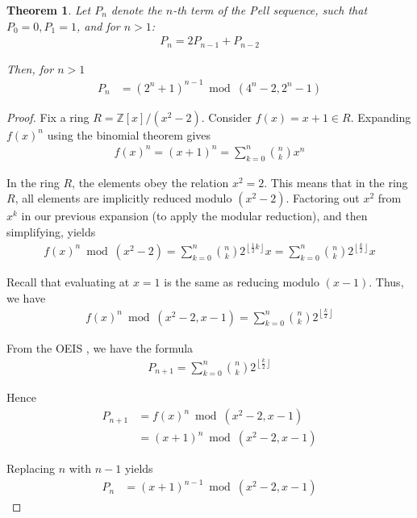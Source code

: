 \documentclass[12pt,reqno]{article}
\theoremstyle{plain}
\newtheorem{theorem}{Theorem}
\theoremstyle{definition}
\newcommand{\floor}[1]{\left\lfloor #1 \right\rfloor}
\begin{document}
\begin{theorem} \label{theorem:pell}
Let $P_n$ denote the $n$-th term of the Pell sequence, such that $P_0 = 0, P_1 = 1$, and for $n > 1$:
\begin{align*}
    P_n = 2 P_{n-1} + P_{n-2}
\end{align*}

Then, for $n > 1$
\begin{align*}
P_n &= (2^n + 1)^{n-1} \bmod{(4^n-2, 2^n-1)}
\end{align*}
\end{theorem}
\begin{proof}
Fix a ring $R = \mathbb{Z}[x]/(x^2 - 2)$. Consider $f(x) = x+1 \in R$. Expanding $f(x)^n$ using the binomial theorem gives
\begin{align*}
    f(x)^n = (x+1)^n = \sum_{k=0}^{n} \binom{n}{k} x^n
\end{align*}

In the ring $R$, the elements obey the relation $x^2 = 2$. This means that in the ring $R$, all elements are implicitly reduced modulo $(x^2 - 2)$. Factoring out $x^2$ from $x^k$ in our previous expansion (to apply the modular reduction), and then simplifying, yields
\begin{align*}
    f(x)^n \bmod{(x^2 - 2)} = \sum_{k=0}^{n} \binom{n}{k} 2^{\floor{\frac{1}{2} k}} x
    = \sum_{k=0}^{n} \binom{n}{k} 2^{\floor{\frac{k}{2}}} x
\end{align*}

Recall that evaluating at $x=1$ is the same as reducing modulo $(x-1)$. Thus, we have
\begin{align*}
    f(x)^n \bmod{(x^2-2, x-1)} = \sum_{k=0}^{n} \binom{n}{k} 2^{\floor{\frac{k}{2}}}
\end{align*}

From the OEIS \cite{A000129}, we have the formula
\begin{align*}
    P_{n+1} = \sum_{k=0}^{n} \binom{n}{k} 2^{\floor{\frac{k}{2}}}
\end{align*}

Hence
\begin{align*}
    P_{n+1} &= f(x)^n \bmod{(x^2-2, x-1)} \\
    &= (x+1)^n \bmod{(x^2-2, x-1)}
\end{align*}

Replacing $n$ with $n-1$ yields
\begin{align*}
    P_n &= (x+1)^{n-1} \bmod{(x^2-2, x-1)}
\end{align*}


\end{proof}
\end{document}

